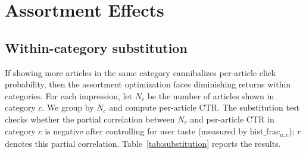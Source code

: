 \documentclass[11pt]{article}
\begin{document}
\section{Assortment Effects}
\label{sec:assortment}

\subsection{Within-category substitution}

If showing more articles in the same category cannibalizes per-article click probability, then the assortment optimization faces diminishing returns within categories. For each impression, let $N_c$ be the number of articles shown in category $c$. We group by $N_c$ and compute per-article CTR. The substitution test checks whether the partial correlation between $N_c$ and per-article CTR in category $c$ is negative after controlling for user taste (measured by $\text{hist\_frac}_{u,c}$); $r$ denotes this partial correlation. Table~\ref{tab:substitution} reports the results.
\end{document}
